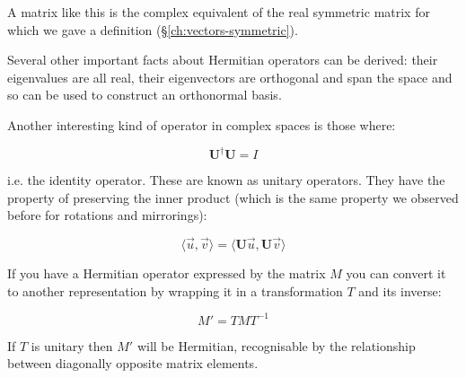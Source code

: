 A matrix like this is the complex equivalent of the real symmetric matrix for which we gave a definition (§\ref{ch:vectors-symmetric}).

Several other important facts about Hermitian operators can be derived: their eigenvalues are all real, their eigenvectors are orthogonal and span the space and so can be used to construct an orthonormal basis.

Another interesting kind of operator in complex spaces is those where:

$$\mathbf{U}^\dagger \mathbf{U} = I$$

i.e. the identity operator. These are known as unitary operators. They have the property of preserving the inner product (which is the same property we observed before for rotations and mirrorings):

$$\langle \vec{u}, \vec{v} \rangle = \langle \mathbf{U} \vec{u}, \mathbf{U} \vec{v} \rangle$$

If you have a Hermitian operator expressed by the matrix $M$ you can convert it to another representation by wrapping it in a transformation $T$ and its inverse:

$$M' = T M T^{-1}$$

If $T$ is unitary then $M'$ will be Hermitian, recognisable by the relationship between diagonally opposite matrix elements.